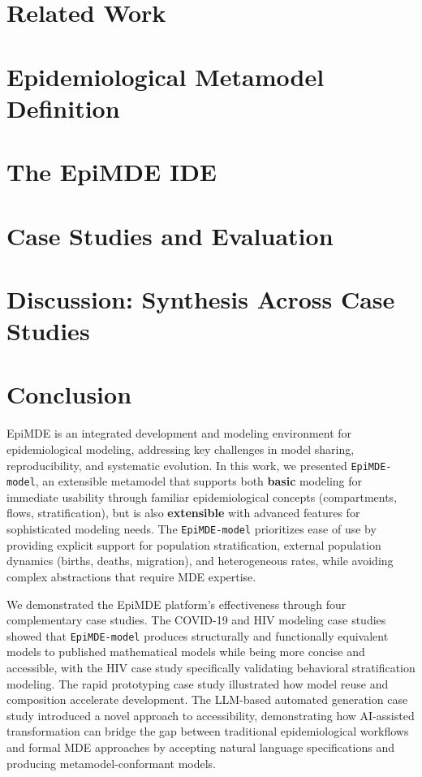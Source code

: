 \documentclass[pdflatex,sn-mathphys-num]{sn-jnl}%
\theoremstyle{thmstyleone}%
\theoremstyle{thmstyletwo}%
\theoremstyle{thmstylethree}%
\begin{document}
\section{Related Work}
\label{sec:related}


\section{Epidemiological Metamodel Definition}
\label{sec:metamodel}


\section{The EpiMDE IDE}
\label{sec:EpiMDE}



\section{Case Studies and Evaluation}
\label{sec:study}


\section{Discussion: Synthesis Across Case Studies}
\label{sec:discussion}



\section{Conclusion}
EpiMDE is an integrated development and modeling environment for epidemiological modeling, addressing key challenges in model sharing, reproducibility, and systematic evolution. In this work, we presented \texttt{EpiMDE-model}, an extensible metamodel that supports both \textbf{basic} modeling for immediate usability through familiar epidemiological concepts (compartments, flows, stratification), but is also \textbf{extensible} with advanced features for sophisticated modeling needs. The \texttt{EpiMDE-model} prioritizes ease of use by providing explicit support for population stratification, external population dynamics (births, deaths, migration), and heterogeneous rates, while avoiding complex abstractions that require MDE expertise.

We demonstrated the EpiMDE platform's effectiveness through four complementary case studies. The COVID-19 and HIV modeling case studies showed that \texttt{EpiMDE-model} produces structurally and functionally equivalent models to published mathematical models while being more concise and accessible, with the HIV case study specifically validating behavioral stratification modeling. The rapid prototyping case study illustrated how model reuse and composition accelerate development. The LLM-based automated generation case study introduced a novel approach to accessibility, demonstrating how AI-assisted transformation can bridge the gap between traditional epidemiological workflows and formal MDE approaches by accepting natural language specifications and producing metamodel-conformant models.
\end{document}
